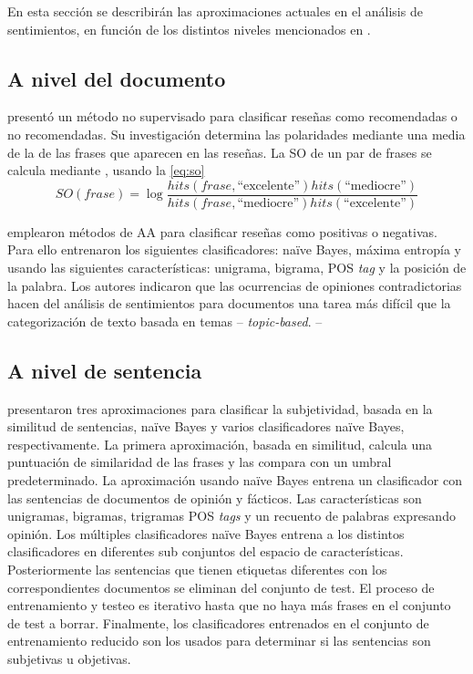 En esta sección se describirán las aproximaciones actuales en el análisis de
sentimientos, en función de los distintos niveles mencionados en
.

\subsection{A nivel del documento}
\label{subsec:soadocument}

\citeauthor{Turney2002} \cite{Turney2002} presentó un método no supervisado para
clasificar reseñas como recomendadas o no recomendadas. Su investigación
determina las polaridades mediante una media de la
 de las frases
que aparecen en las reseñas. La \ac{SO} de un par de frases se calcula mediante
 \cite{Turney2001}, usando la \autoref{eq:so}
\begin{equation}
  \label{eq:so}
  SO(frase) = \log\frac{hits(frase,
    \text{``excelente''})hits(\text{``mediocre''})}{hits(frase, \text{``mediocre''})hits(\text{``excelente''})}
\end{equation}

\citeauthor{Pang2002} \cite{Pang2002} emplearon métodos de \ac{AA} para
clasificar reseñas como positivas o negativas. Para ello entrenaron los
siguientes clasificadores: naïve Bayes, máxima entropía y 
usando las siguientes características: unigrama, bigrama, \ac{POS} \emph{tag} y
la posición de la palabra. Los autores indicaron que las ocurrencias de
opiniones contradictorias hacen del análisis de sentimientos para documentos una
tarea más difícil que la categorización de texto basada en temas --
\emph{topic-based}. --

\subsection{A nivel de sentencia}
\label{subsec:soasentence}

\citeauthor{Yu2003} \cite{Yu2003} presentaron tres aproximaciones para
clasificar la subjetividad, basada en la similitud de sentencias, naïve Bayes y
varios clasificadores naïve Bayes, respectivamente. La primera aproximación,
basada en similitud, calcula una puntuación de similaridad de las frases y las
compara con un umbral predeterminado. La aproximación usando naïve Bayes entrena
un clasificador con las sentencias de documentos de opinión y fácticos. Las
características son unigramas, bigramas, trigramas \ac{POS} \emph{tags} y un
recuento de palabras expresando opinión. Los múltiples clasificadores naïve
Bayes entrena a los distintos clasificadores en diferentes sub conjuntos del
espacio de características. Posteriormente las sentencias que tienen etiquetas
diferentes con los correspondientes documentos se eliminan del conjunto de
test. El proceso de entrenamiento y testeo es iterativo hasta que no haya más
frases en el conjunto de test a borrar. Finalmente, los clasificadores
entrenados en el conjunto de entrenamiento reducido son los usados para
determinar si las sentencias son subjetivas u objetivas.

